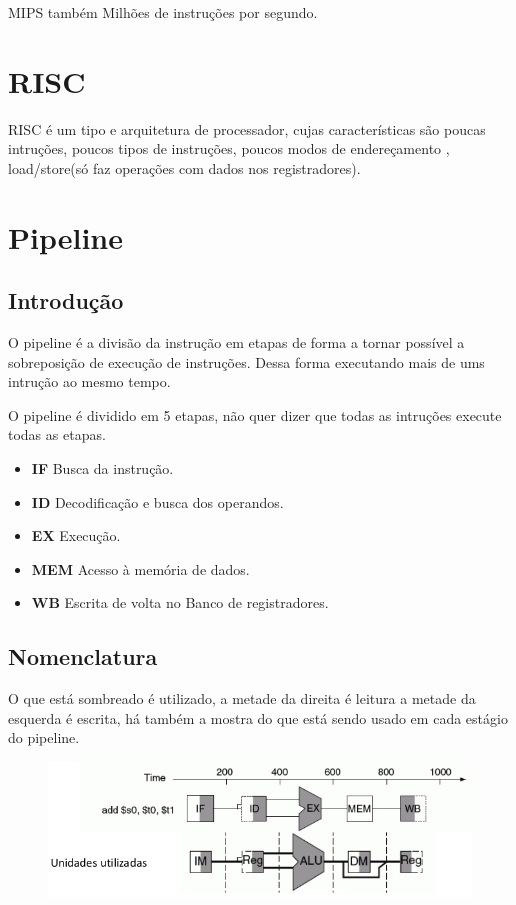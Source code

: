 \documentclass[a4paper]{article}
\begin{document}
MIPS também Milhões de instruções por segundo.

\section{RISC}
RISC é um tipo e arquitetura de processador, cujas características são poucas intruções, poucos tipos de instruções,
poucos modos de endereçamento ,  load/store(só faz operações com dados nos registradores).
\section{ Pipeline }
\subsection{Introdução}
    O pipeline é a divisão da instrução em etapas de forma a tornar possível a sobreposição de execução de instruções.
    Dessa forma executando mais de ums intrução ao mesmo tempo.

    O pipeline é dividido em 5 etapas, não quer dizer que todas as intruções execute todas as etapas.
    \begin{itemize}
        \item \textbf{IF} Busca da instrução.
        \item \textbf{ID} Decodificação e busca dos operandos.
        \item \textbf{EX} Execução.
        \item \textbf{MEM} Acesso à memória de dados.
        \item \textbf{WB} Escrita de volta no Banco de registradores.
    \end{itemize}
\subsection{Nomenclatura}
    O que está sombreado é utilizado, a metade da direita é leitura a metade da esquerda é escrita, há também a mostra
    do que está sendo usado em cada estágio do pipeline.

    \begin{figure}
        \includegraphics[width=1.2\textwidth]{nomenclatura}
    \end{figure}
\end{document}
